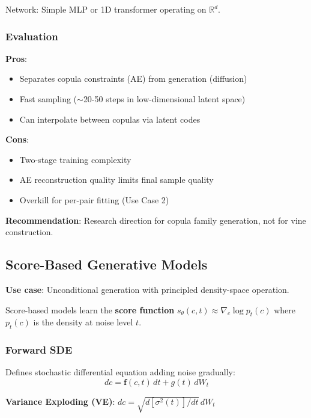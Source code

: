 \documentclass[11pt]{article}
\begin{document}
Network: Simple MLP or 1D transformer operating on $\mathbb{R}^d$.

\subsubsection{Evaluation}

\textbf{Pros}:
\begin{itemize}
    \item Separates copula constraints (AE) from generation (diffusion)
    \item Fast sampling ($\sim$20-50 steps in low-dimensional latent space)
    \item Can interpolate between copulas via latent codes
\end{itemize}

\textbf{Cons}:
\begin{itemize}
    \item Two-stage training complexity
    \item AE reconstruction quality limits final sample quality
    \item Overkill for per-pair fitting (Use Case 2)
\end{itemize}

\textbf{Recommendation}: Research direction for copula family generation, not for vine construction.

\subsection{Score-Based Generative Models}

\textbf{Use case}: Unconditional generation with principled density-space operation.

Score-based models \cite{song2020score} learn the \textbf{score function} $s_\theta(c, t) \approx \nabla_c \log p_t(c)$ where $p_t(c)$ is the density at noise level $t$.

\subsubsection{Forward SDE}

Defines stochastic differential equation adding noise gradually:
\begin{equation}
dc = \mathbf{f}(c, t) \, dt + g(t) \, dW_t
\end{equation}

\textbf{Variance Exploding (VE)}:  $dc = \sqrt{d[\sigma^2(t)]/dt} \, dW_t$
\end{document}

